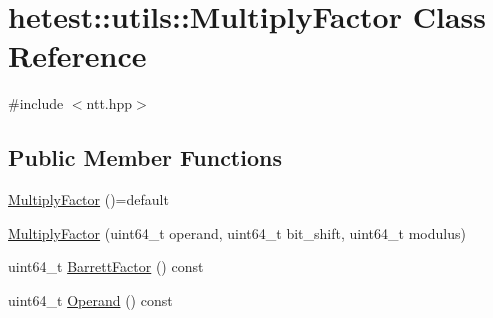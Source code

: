 \hypertarget{classhetest_1_1utils_1_1MultiplyFactor}{\section{hetest\-:\-:utils\-:\-:Multiply\-Factor Class Reference}
\label{classhetest_1_1utils_1_1MultiplyFactor}
}


{\ttfamily \#include $<$ntt.\-hpp$>$}

\subsection*{Public Member Functions}
\begin{DoxyCompactItemize}
\item 
\hyperlink{classhetest_1_1utils_1_1MultiplyFactor_a86c6f365d618c90d08e52855190be15c}{Multiply\-Factor} ()=default
\item 
\hyperlink{classhetest_1_1utils_1_1MultiplyFactor_aaf6b00666ac003d44f1f71d98fc3c9a1}{Multiply\-Factor} (uint64\-\_\-t operand, uint64\-\_\-t bit\-\_\-shift, uint64\-\_\-t modulus)
\item 
uint64\-\_\-t \hyperlink{classhetest_1_1utils_1_1MultiplyFactor_ae39a0ca3d2b8f97db8e28ed3f1cf9957}{Barrett\-Factor} () const 
\item 
uint64\-\_\-t \hyperlink{classhetest_1_1utils_1_1MultiplyFactor_adb9a6acac4142a551ad70cf9bbb56389}{Operand} () const 
\end{DoxyCompactItemize}


